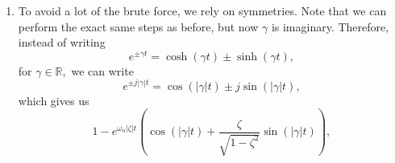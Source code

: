 \documentclass{article}
\numberwithin{equation}{section}
\begin{document}
\begin{enumerate}[label=\textbf{1.\arabic*}]
\begin{enumerate}[label=(\alph*)]
\begin{align}
        \right\} \\ 
        &= \frac{\omega_n^2}{\omega_n^2\zeta^2-\gamma^2} + \frac{\omega_n^2}{2\gamma^2-2\gamma \omega_n \zeta}e^{-\omega_n \zeta t}e^{\gamma t} + \frac{\omega_n^2}{2\gamma^2 + 2\gamma \omega_n \zeta}e^{-\omega_n \zeta t}e^{-\gamma t} \\ 
        &= \frac{\omega_n^2}{\omega_n^2\zeta^2-\gamma^2} + \frac{\omega_n^2}{2\gamma}e^{-\omega_n \zeta t}\left(\frac{e^{\gamma t}}{\gamma- \omega_n \zeta} + \frac{e^{-\gamma t}}{\gamma+ \omega_n \zeta}\right) \\ 
        &= \frac{\omega_n^2}{\omega_n^2\zeta^2-\gamma^2} + \frac{\omega_n^2}{2\gamma}e^{-\omega_n \zeta t}\left(\frac{e^{\gamma t}(\gamma+\omega_n\zeta) + e^{-\gamma t}(\gamma - \omega_n\zeta)}{\gamma^2- \omega_n^2 \zeta^2}\right) \\ 
        &= \frac{\omega_n^2}{\omega_n^2\zeta^2-\gamma^2} + \frac{\omega_n^2}{2\gamma}e^{-\omega_n \zeta t}\left(\frac{(\cosh \gamma t + \sinh \gamma t)(\gamma+\omega_n\zeta) + (\cosh \gamma t- \sinh \gamma t)(\gamma - \omega_n\zeta)}{\gamma^2- \omega_n^2 \zeta^2}\right) \\ 
        &= \frac{\omega_n^2}{\omega_n^2\zeta^2-\gamma^2} + \frac{\omega_n^2}{2\gamma}e^{-\omega_n \zeta t}\left(\frac{2\gamma \cosh \gamma t + 2 \omega_n \zeta \sinh \gamma t}{\gamma^2- \omega_n^2 \zeta^2}\right) \\ 
        &= \frac{\omega_n^2}{\omega_n^2\zeta^2 - \gamma^2}\left(1 -e^{-\omega_n\zeta t}\left[ \cosh(\gamma t) + \frac{\omega_n\zeta}{\gamma}\sinh \gamma t\right] \right) \\ 
        &= 1 - e^{-\omega_n\zeta t}\left(\cosh(\gamma t) + \frac{\zeta}{\sqrt{\zeta^2-1}}\sinh \gamma t\right).
    \end{align}
    \item To avoid a lot of the brute force, we rely on symmetries. Note that we can perform the exact same steps as before, but now $\gamma$ is imaginary. Therefore, instead of writing
    \begin{equation}
        e^{\pm \gamma t} = \cosh(\gamma t) \pm \sinh(\gamma t),
    \end{equation}
    for $\gamma\in\mathbb{R},$ we can write 
    \begin{equation}
        e^{\pm j|\gamma| t} = \cos(|\gamma| t) \pm j \sin(|\gamma| t),
    \end{equation}
    which gives us 
    \begin{equation}
        1 - e^{\omega_n|\zeta| t}\left(\cos(|\gamma|t) + \frac{\zeta}{\sqrt{1-\zeta^2}}\sin(|\gamma|t)\right),

\end{equation}
\end{enumerate}
\end{enumerate}
\end{document}
